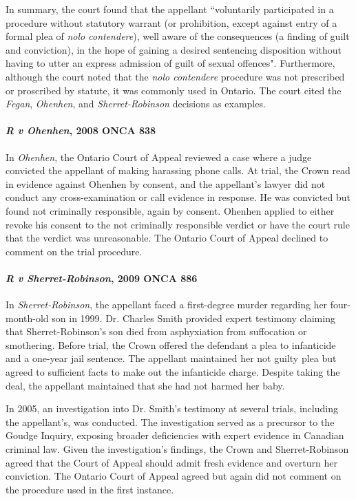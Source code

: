 In summary, the court found that the appellant ``voluntarily participated in a procedure without statutory warrant (or prohibition, except against entry of a formal plea of \textit{nolo contendere}), well aware of the consequences (a finding of guilt and conviction), in the hope of gaining a desired sentencing disposition without having to utter an express admission of guilt of sexual offences". Furthermore, although the court noted that the \textit{nolo contendere} procedure was not prescribed or proscribed by statute, it was commonly used in Ontario. The court cited the \textit{Fegan}, \textit{Ohenhen}, and \textit{Sherret-Robinson} decisions as examples. 

\paragraph{\textit{R v Ohenhen}, 2008 ONCA 838\\}

In \textit{Ohenhen}, the Ontario Court of Appeal reviewed a case where a judge convicted the appellant of making harassing phone calls. At trial, the Crown read in evidence against Ohenhen by consent, and the appellant's lawyer did not conduct any cross-examination or call evidence in response. He was convicted but found not criminally responsible, again by consent. Ohenhen applied to either revoke his consent to the not criminally responsible verdict or have the court rule that the verdict was unreasonable. The Ontario Court of Appeal declined to comment on the trial procedure.

\paragraph{\textit{R v Sherret-Robinson}, 2009 ONCA 886\\}

In \textit{Sherret-Robinson}, the appellant faced a first-degree murder regarding her four-month-old son in 1999. Dr. Charles Smith provided expert testimony claiming that Sherret-Robinson's son died from asphyxiation from suffocation or smothering. Before trial, the Crown offered the defendant a plea to infanticide and a one-year jail sentence. The appellant maintained her not guilty plea but agreed to sufficient facts to make out the infanticide charge. Despite taking the deal, the appellant maintained that she had not harmed her baby.

In 2005, an investigation into Dr. Smith's testimony at several trials, including the appellant's, was conducted. The investigation served as a precursor to the Goudge Inquiry, exposing broader deficiencies with expert evidence in Canadian criminal law. Given the investigation's findings, the Crown and Sherret-Robinson agreed that the Court of Appeal should admit fresh evidence and overturn her conviction. The Ontario Court of Appeal agreed but again did not comment on the procedure used in the first instance.

